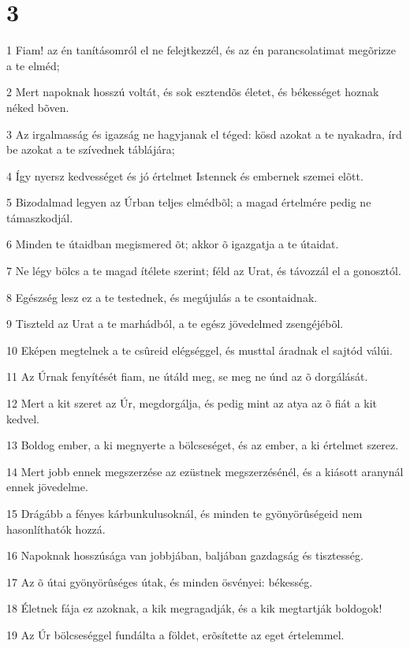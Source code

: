 \chapter{3}

\par 1 Fiam! az én tanításomról el ne felejtkezzél, és az én parancsolatimat megõrizze a te elméd;
\par 2 Mert napoknak hosszú voltát, és sok esztendõs életet, és békességet hoznak néked bõven.
\par 3 Az irgalmasság és igazság ne hagyjanak el téged: kösd azokat  a te nyakadra, írd be azokat a te szívednek táblájára;
\par 4 Így nyersz kedvességet és jó értelmet Istennek és embernek szemei elõtt.
\par 5 Bizodalmad legyen az Úrban teljes elmédbõl; a magad értelmére pedig ne támaszkodjál.
\par 6 Minden te útaidban megismered õt; akkor õ igazgatja a te útaidat.
\par 7 Ne légy bölcs a te magad  ítélete szerint; féld az Urat, és távozzál el a gonosztól.
\par 8 Egészség lesz ez a te testednek, és megújulás a te csontaidnak.
\par 9 Tiszteld az Urat a te marhádból, a te egész jövedelmed zsengéjébõl.
\par 10 Eképen megtelnek a te csûreid elégséggel, és musttal áradnak el sajtód válúi.
\par 11 Az Úrnak fenyítését fiam, ne útáld meg, se meg ne únd az õ dorgálását.
\par 12 Mert a kit szeret az Úr, megdorgálja, és pedig mint az atya az õ fiát a kit kedvel.
\par 13 Boldog ember, a ki megnyerte a bölcseséget, és az ember, a ki értelmet szerez.
\par 14 Mert jobb ennek megszerzése az ezüstnek megszerzésénél, és a kiásott aranynál ennek jövedelme.
\par 15 Drágább a fényes kárbunkulusoknál, és minden te gyönyörûségeid nem hasonlíthatók hozzá.
\par 16 Napoknak hosszúsága van jobbjában, baljában gazdagság és tisztesség.
\par 17 Az õ útai gyönyörûséges útak, és minden ösvényei: békesség.
\par 18 Életnek fája ez azoknak, a kik megragadják, és a kik  megtartják boldogok!
\par 19 Az Úr bölcseséggel fundálta a földet, erõsítette az eget értelemmel.
